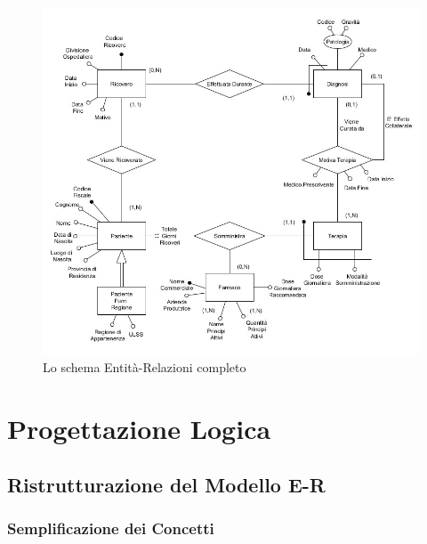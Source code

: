 \documentclass{article}
\begin{document}
\begin{figure}[H] %
    \centering
    \includegraphics[width=\linewidth]{schema1}
    \caption{Lo schema Entità-Relazioni completo}
    \label{schema_ER_progettazione_modello}
\end{figure}






\clearpage
\section{Progettazione Logica}


\subsection{Ristrutturazione del Modello E-R}
\subsubsection{Semplificazione dei Concetti}
\end{document}
